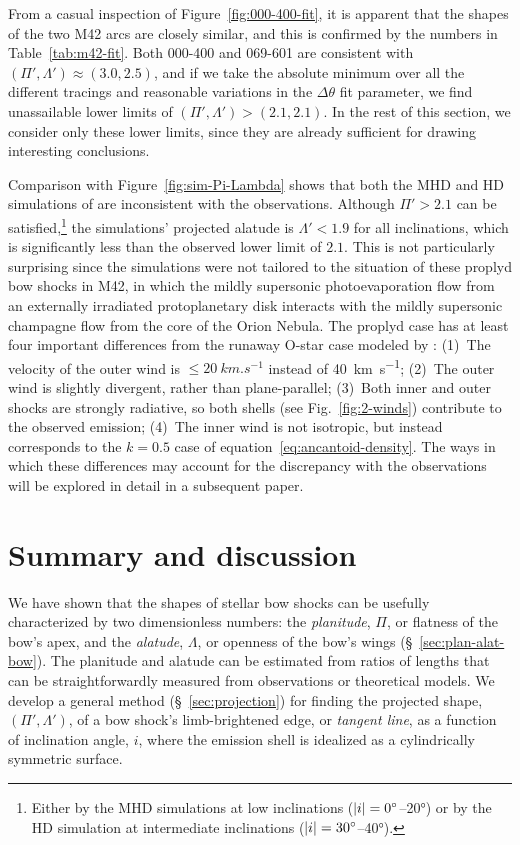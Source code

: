 From a casual inspection of Figure~\ref{fig:000-400-fit}, it is
apparent that the shapes of the two M42 arcs are closely similar, and
this is confirmed by the numbers in Table~\ref{tab:m42-fit}. Both
000-400 and 069-601 are consistent with
\((\Pi', \Lambda') \approx (3.0, 2.5)\), and if we take the absolute minimum over
all the different tracings and reasonable variations in the
\(\Delta\theta\) fit parameter, we find unassailable lower limits of
\((\Pi', \Lambda') > (2.1, 2.1)\).  In the rest of this section, we consider
only these lower limits, since they are already sufficient for drawing
interesting conclusions.

Comparison with Figure~\ref{fig:sim-Pi-Lambda} shows that both the MHD
and HD simulations of \citet{Meyer:2016a} are inconsistent with the
observations.  Although \(\Pi' > 2.1\) can be satisfied,\footnote{%
  Either by the MHD simulations at low inclinations
  (\(\lvert i\rvert = \ang{0}\)--\ang{20}) or by the HD simulation at
  intermediate inclinations (\(\lvert i\rvert = \ang{30}\)--\ang{40}).} %
the simulations' projected alatude is \(\Lambda' < 1.9\) for all
inclinations, which is significantly less than the observed lower
limit of \(2.1\).  This is not particularly surprising since the
simulations were not tailored to the situation of these proplyd bow
shocks in M42, in which the mildly supersonic photoevaporation flow
from an externally irradiated protoplanetary disk interacts with the
mildly supersonic champagne flow from the core of the Orion Nebula.
The proplyd case has at least four important differences from the
runaway O-star case modeled by \citet{Meyer:2016a}: (1)~The velocity
of the outer wind is \(\le \SI{20}{km.s^{-1}}\) instead of
\SI{40}{km.s^{-1}}; (2)~The outer wind is slightly divergent, rather
than plane-parallel; (3)~Both inner and outer shocks are strongly
radiative, so both shells (see Fig.~\ref{fig:2-winds}) contribute to
the observed emission; (4)~The inner wind is not isotropic, but
instead corresponds to the \(k = 0.5\) case of
equation~\eqref{eq:ancantoid-density}.  The ways in which these
differences may account for the discrepancy with the observations will
be explored in detail in a subsequent paper.

\section{Summary and discussion}
\label{sec:conc}

We have shown that the shapes of stellar bow shocks can be usefully
characterized by two dimensionless numbers: the \textit{planitude},
\(\Pi\), or flatness of the bow's apex, and the \textit{alatude},
\(\Lambda\), or openness of the bow's wings (\S~\ref{sec:plan-alat-bow}).
The planitude and alatude can be estimated from ratios of lengths that
can be straightforwardly measured from observations or theoretical
models.  We develop a general method (\S~\ref{sec:projection}) for
finding the projected shape, \((\Pi', \Lambda')\), of a bow shock's
limb-brightened edge, or \textit{tangent line}, as a function of
inclination angle, \(i\), where the emission shell is idealized as a
cylindrically symmetric surface.

